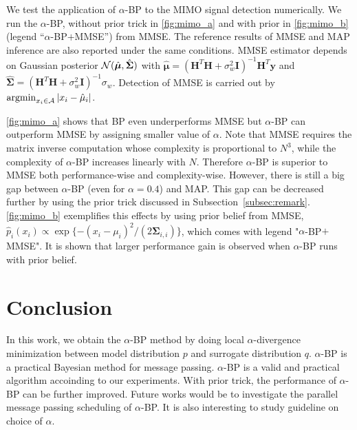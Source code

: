 \documentclass[conference]{IEEEtran}
\begin{document}
We test the application of $\alpha$-BP to the MIMO signal detection numerically. We run the $\alpha$-BP, without prior trick in \autoref{fig:mimo_a} and with prior in \autoref{fig:mimo_b} (legend ``$\alpha$-BP$+$MMSE'') from MMSE. The reference results of MMSE and MAP inference are also reported under the same conditions. MMSE estimator depends on Gaussian posterior $\mathcal{N}(\hat{\bm{\mu}}, \hat{\bm{\Sigma}})$ with $\hat{\bm{\mu}} = (\bm{H}^{T}\bm{H} + \sigma_w^2 \bm{I})^{-1}\bm{H}^{T}\bm{y}$ and $\hat{\bm{\Sigma}} = (\bm{H}^{T}\bm{H} + \sigma_w^2 \bm{I})^{-1}\sigma_w$. Detection of MMSE is carried out by $\operatorname{argmin}_{x_i\in \mathcal{A}}| x_i-\hat{\mu}_i |$.%

\autoref{fig:mimo_a} shows that BP even underperforms MMSE but $\alpha$-BP can outperform MMSE by assigning smaller value of $\alpha$.
Note that MMSE requires the matrix inverse computation whose complexity is proportional to $N^3$, while the complexity of $\alpha$-BP increases linearly with $N$. Therefore $\alpha$-BP is superior to MMSE both performance-wise and complexity-wise.  
However, there is still a big gap between $\alpha$-BP (even for $\alpha=0.4$) and MAP. This gap can be decreased further by using the prior trick discussed in Subsection~\ref{subsec:remark}. \autoref{fig:mimo_b} exemplifies this effects by using prior belief from MMSE, $\hat{p}_i(x_i)\propto \exp\{-(x_i-\mu_i)^2/(2\bm{\Sigma}_{i,i})\}$, which comes with legend "$\alpha$-BP$+$MMSE". It is shown that larger performance gain is observed when $\alpha$-BP runs with prior belief.

\section{Conclusion}
In this work, we obtain the $\alpha$-BP method by doing local $\alpha$-divergence minimization between model distribution $p$ and surrogate distribution $q$. $\alpha$-BP is a practical Bayesian method for message passing. $\alpha$-BP is a valid and practical algorithm accoinding to our experiments. With prior trick, the performance of $\alpha$-BP can be further improved. Future works would be to investigate the parallel message passing scheduling of $\alpha$-BP. It is also interesting to study guideline on choice of $\alpha$.



% 



% 
\end{document}
